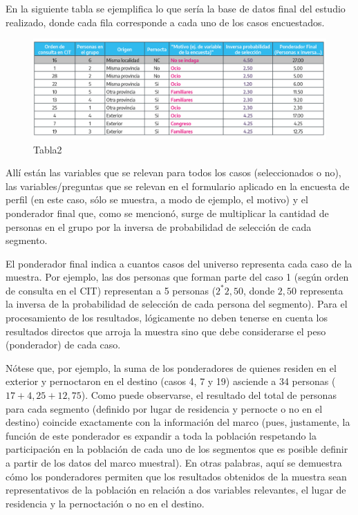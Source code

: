 \documentclass[
]{book}
\begin{document}
En la siguiente tabla se ejemplifica lo que sería la base de datos final del estudio realizado, donde cada fila corresponde a cada uno de los casos encuestados.

\begin{figure}
\includegraphics[width=1\linewidth]{imagenes/tabla_2} \caption{Tabla2}\label{fig:Casosencuestados}
\end{figure}

Allí están las variables que se relevan para todos los casos (seleccionados o no), las variables/preguntas que se relevan en el formulario aplicado en la encuesta de perfil (en este caso, sólo se muestra, a modo de ejemplo, el motivo) y el ponderador final que, como se mencionó, surge de multiplicar la cantidad de personas en el grupo por la inversa de probabilidad de selección de cada segmento.

El ponderador final indica a cuantos casos del universo representa cada caso de la muestra. Por ejemplo, las dos personas que forman parte del caso 1 (según orden de consulta en el CIT) representan a 5 personas (\(2^* 2,50\), donde \(2,50\) representa la inversa de la probabilidad de selección de cada persona del segmento). Para el procesamiento de los resultados, lógicamente no deben tenerse en cuenta los resultados directos que arroja la muestra sino que debe considerarse el peso (ponderador) de cada caso.

Nótese que, por ejemplo, la suma de los ponderadores de quienes residen en el exterior y pernoctaron en el destino (casos 4, 7 y 19) asciende a 34 personas (\(17+4,25+12,75\)). Como puede observarse, el resultado del total de personas para cada segmento (definido por lugar de residencia y pernocte o no en el destino) coincide exactamente con la información del marco (pues, justamente, la función de este ponderador es expandir a toda la población respetando la participación en la población de cada uno de los segmentos que es posible definir a partir de los datos del marco muestral). En otras palabras, aquí se demuestra cómo los ponderadores permiten que los resultados obtenidos de la muestra sean representativos de la población en relación a dos variables relevantes, el lugar de residencia y la pernoctación o no en el destino.
\end{document}
